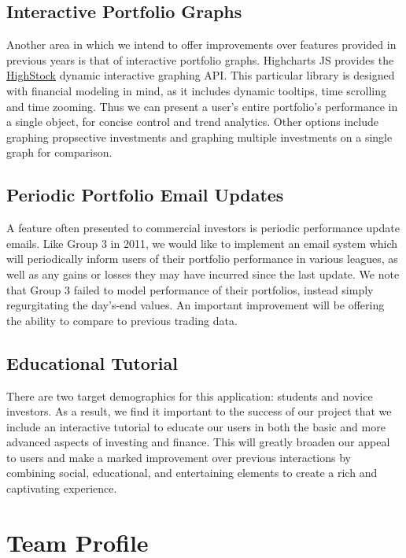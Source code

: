 \documentclass[11pt,letterpaper,oneside]{memoir}
\begin{document}
\section{Interactive Portfolio Graphs}

Another area in which we intend to offer improvements over features provided in previous years
is that of interactive portfolio graphs. Highcharts JS provides the 
\href{http://www.highcharts.com/products/highstock}{HighStock} dynamic interactive graphing API.
This particular library is designed with financial modeling in mind, as it includes 
dynamic tooltips, time scrolling and time zooming. Thus we can present a user's entire 
portfolio's performance in a single object, for concise control and trend analytics. Other 
options include graphing propsective investments and graphing multiple investments on a 
single graph for comparison.

\section{Periodic Portfolio Email Updates}

A feature often presented to commercial investors is periodic performance update emails.
Like Group 3 in 2011, we would like to implement an email system which
will periodically inform users of their portfolio performance in various leagues, as well
as any gains or losses they may have incurred since the last update. We note that Group 3
failed to model performance of their portfolios, instead simply regurgitating the day's-end
values. An important improvement will be offering the ability to compare to previous trading
data.

\section{Educational Tutorial}

There are two target demographics for this application: students and novice investors. As a
result, we find it important to the success of our project that we include an interactive
tutorial to educate our users in both the basic and more advanced aspects of investing
and finance. This will greatly broaden our appeal to users and make a marked improvement over
previous interactions by combining social, educational, and entertaining elements to create
a rich and captivating experience.

\chapter{Team Profile}
\end{document}
